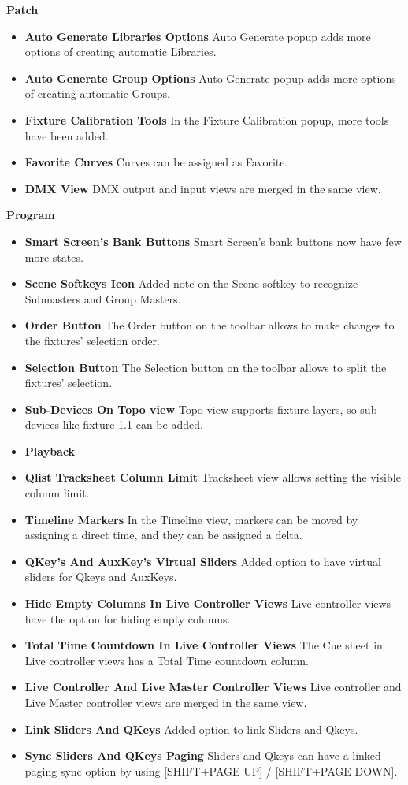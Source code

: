 \documentclass[
]{article}
\begin{document}
\textbf{Patch}

\begin{itemize}
\item
  \textbf{Auto Generate Libraries Options} Auto Generate popup adds more options of creating automatic Libraries.
\item
  \textbf{Auto Generate Group Options} Auto Generate popup adds more options of creating automatic Groups.
\item
  \textbf{Fixture Calibration Tools} In the Fixture Calibration popup, more tools have been added.
\item
  \textbf{Favorite Curves} Curves can be assigned as Favorite.
\item
  \textbf{DMX View} DMX output and input views are merged in the same view.
\end{itemize}

\textbf{Program}

\begin{itemize}
\item
  \textbf{Smart Screen's Bank Buttons} Smart Screen's bank buttons now have few more states.
\item
  \textbf{Scene Softkeys Icon} Added note on the Scene softkey to recognize Submasters and Group Masters.
\item
  \textbf{Order Button} The Order button on the toolbar allows to make changes to the fixtures' selection order.
\item
  \textbf{Selection Button} The Selection button on the toolbar allows to split the fixtures' selection.
\item
  \textbf{Sub-Devices On Topo view} Topo view supports fixture layers, so sub-devices like fixture 1.1 can be added.
\item
  \textbf{Playback}
\item
  \textbf{Qlist Tracksheet Column Limit} Tracksheet view allows setting the visible column limit.
\item
  \textbf{Timeline Markers} In the Timeline view, markers can be moved by assigning a direct time, and they can be assigned a delta.
\item
  \textbf{QKey's And AuxKey's Virtual Sliders} Added option to have virtual sliders for Qkeys and AuxKeys.
\item
  \textbf{Hide Empty Columns In Live Controller Views} Live controller views have the option for hiding empty columns.
\item
  \textbf{Total Time Countdown In Live Controller Views} The Cue sheet in Live controller views has a Total Time countdown column.
\item
  \textbf{Live Controller And Live Master Controller Views} Live controller and Live Master controller views are merged in the same view.
\item
  \textbf{Link Sliders And QKeys} Added option to link Sliders and Qkeys.
\item
  \textbf{Sync Sliders And QKeys Paging} Sliders and Qkeys can have a linked paging sync option by using {[}SHIFT+PAGE UP{]} / {[}SHIFT+PAGE DOWN{]}.
\end{itemize}
\end{document}
